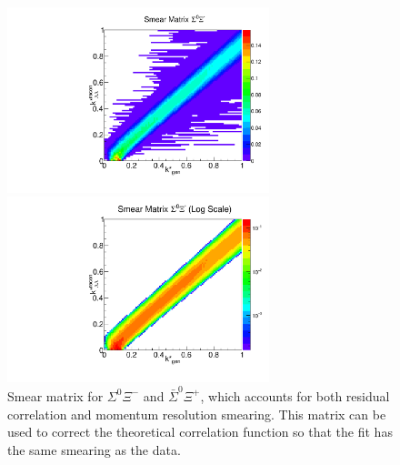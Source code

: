 \begin{figure}[h]
\begin{minipage}{18pc}
\includegraphics[width=18pc]{Figures/SmearMatrices/2016-7-19-SmearMatrixSigmaXiCNormLLAA.pdf}
\end{minipage}\hspace{2pc}
\begin{minipage}{18pc}
\includegraphics[width=18pc]{Figures/SmearMatrices/2016-7-19-SmearMatrixSigmaXiCNormLLAALog.pdf}
\end{minipage} 
\caption[Smear matrix -- $\Sigma^0\Xi^{-}$ and $\bar{\Sigma}^0\Xi^{+}$]{\label{fig:SmearLA}
Smear matrix for $\Sigma^0\Xi^{-}$ and $\bar{\Sigma}^0\Xi^{+}$, which accounts for both residual correlation and momentum resolution smearing. This matrix can be used to correct the theoretical correlation function so that the fit has the same smearing as the data.
}
\end{figure}


